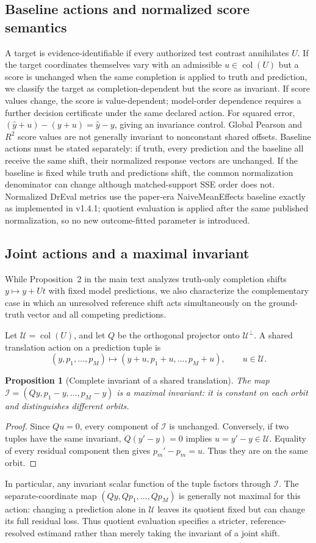 \documentclass[11pt]{article}
\newtheorem{proposition}{Proposition}
\begin{document}
\subsection{Baseline actions and normalized score semantics}
A target is evidence-identifiable if every authorized test contrast annihilates $U$. If the target coordinates themselves vary with an admissible $u\in\operatorname{col}(U)$ but a score is unchanged when the same completion is applied to truth and prediction, we classify the target as completion-dependent but the score as invariant. If score values change, the score is value-dependent; model-order dependence requires a further decision certificate under the same declared action. For squared error, $(\hat y+u)-(y+u)=\hat y-y$, giving an invariance control. Global Pearson and $R^2$ score values are not generally invariant to nonconstant shared offsets. Baseline actions must be stated separately: if truth, every prediction and the baseline all receive the same shift, their normalized response vectors are unchanged. If the baseline is fixed while truth and predictions shift, the common normalization denominator can change although matched-support SSE order does not. Normalized DrEval metrics use the paper-era NaiveMeanEffects baseline exactly as implemented in v1.4.1; quotient evaluation is applied after the same published normalization, so no new outcome-fitted parameter is introduced.


\subsection{Joint actions and a maximal invariant}
While Proposition~2 in the main text analyzes truth-only completion shifts $y \mapsto y + Ut$ with fixed model predictions, we also characterize the complementary case in which an unresolved reference shift acts simultaneously on the ground-truth vector and all competing predictions.

Let $\mathcal U=\operatorname{col}(U)$, and let $Q$ be the orthogonal projector onto $\mathcal U^\perp$. A shared translation action on a prediction tuple is
\[
(y,p_1,\ldots,p_M)\longmapsto(y+u,p_1+u,\ldots,p_M+u),\qquad u\in\mathcal U.
\]
\begin{proposition}[Complete invariant of a shared translation]
The map $\mathcal I=(Qy,p_1-y,\ldots,p_M-y)$ is a maximal invariant: it is constant on each orbit and distinguishes different orbits.
\end{proposition}
\begin{proof}
Since $Qu=0$, every component of $\mathcal I$ is unchanged. Conversely, if two tuples have the same invariant, $Q(y'-y)=0$ implies $u=y'-y\in\mathcal U$. Equality of every residual component then gives $p_m'-p_m=u$. Thus they are on the same orbit.
\end{proof}
In particular, any invariant scalar function of the tuple factors through $\mathcal I$. The separate-coordinate map $(Qy,Qp_1,\ldots,Qp_M)$ is generally not maximal for this action: changing a prediction alone in $\mathcal U$ leaves its quotient fixed but can change its full residual loss. Thus quotient evaluation specifies a stricter, reference-resolved estimand rather than merely taking the invariant of a joint shift.
\end{document}
